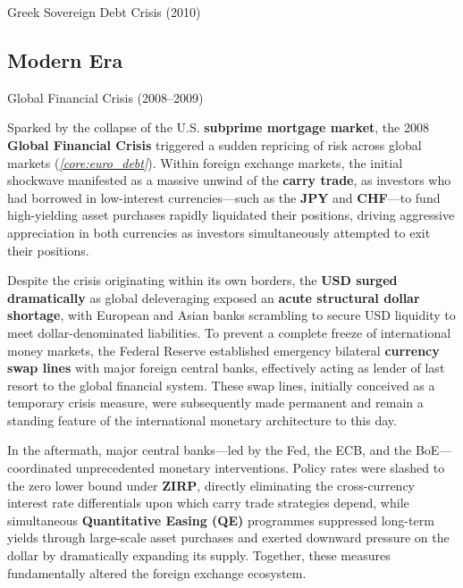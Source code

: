 \documentclass[10pt]{article}
\begin{document}
\begin{core}[label=core:euro_debt]{Greek Sovereign Debt Crisis (2010)}
    \end{core}

  \subsection{Modern Era}

    \begin{core}[label=core:global_crisis]{Global Financial Crisis (2008--2009)}

      Sparked by the collapse of the U.S. \textbf{subprime mortgage market}, the 2008 \textbf{Global Financial Crisis} triggered a sudden repricing of risk across global markets (\textit{\autoref{core:euro_debt}}). Within foreign exchange markets, the initial shockwave manifested as a massive unwind of the \textbf{carry trade}, as investors who had borrowed in low-interest currencies---such as the \textbf{JPY} and \textbf{CHF}---to fund high-yielding asset purchases rapidly liquidated their positions, driving aggressive appreciation in both currencies as investors simultaneously attempted to exit their positions.

      Despite the crisis originating within its own borders, the \textbf{USD surged dramatically} as global deleveraging exposed an \textbf{acute structural dollar shortage}, with European and Asian banks scrambling to secure USD liquidity to meet dollar-denominated liabilities. To prevent a complete freeze of international money markets, the Federal Reserve established emergency bilateral \textbf{currency swap lines} with major foreign central banks, effectively acting as lender of last resort to the global financial system. These swap lines, initially conceived as a temporary crisis measure, were subsequently made permanent and remain a standing feature of the international monetary architecture to this day.


      In the aftermath, major central banks---led by the Fed, the ECB, and the BoE---coordinated unprecedented monetary interventions. Policy rates were slashed to the zero lower bound under \textbf{ZIRP}, directly eliminating the cross-currency interest rate differentials upon which carry trade strategies depend, while simultaneous \textbf{Quantitative Easing (QE)} programmes suppressed long-term yields through large-scale asset purchases and exerted downward pressure on the dollar by dramatically expanding its supply. Together, these measures fundamentally altered the foreign exchange ecosystem.

    \end{core}
\end{document}
